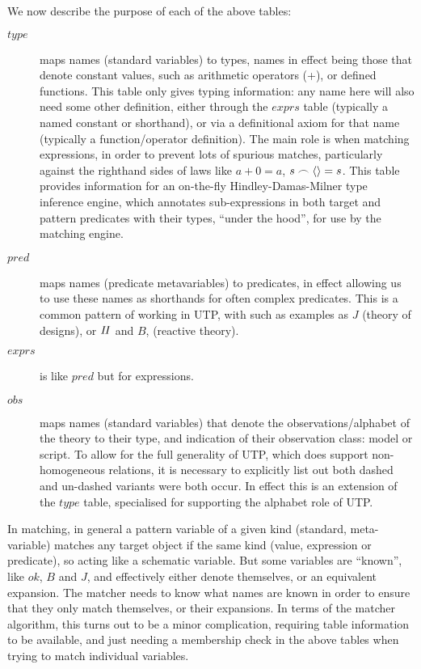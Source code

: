 We now describe the purpose of each of the above tables:
\begin{description}
  \item[$type$]
    maps names (standard variables) to types, names in effect being those that
    denote constant values, such as arithmetic operators (+),
    or defined functions.
    This table only gives typing information:
    any name here will also need some other definition,
    either through the $exprs$ table (typically a named constant or shorthand),
    or via a definitional axiom for that name (typically a function/operator definition).
    The main role is when matching expressions,
    in order to prevent lots of spurious matches, particularly against
    the righthand sides of laws like $a+0=a$, $s \frown \langle \rangle = s$.
    This table provides information for
    an on-the-fly Hindley-Damas-Milner type inference engine\cite{DAMAS82},
    which annotates sub-expressions in both target and pattern predicates
    with their types, ``under the hood'',
    for use by the matching engine.
  \item[$pred$]
    maps names (predicate metavariables) to predicates, in effect allowing us to use these names
    as shorthands for often complex predicates.
    This is a common pattern of working in UTP, with such as examples as $J$
    (theory of designs), or $\mathit{II}$ and $B$, (reactive theory).
  \item[$exprs$]
     is like $pred$ but for expressions.
  \item[$obs$]
    maps names (standard variables) that denote the observations/alphabet of the theory
    to their type, and indication of their observation class: model or script.
    To allow for the full generality of UTP,
    which does support non-homogeneous relations,
    it is necessary to explicitly list out both dashed and un-dashed variants
    were both occur. In effect this is an extension of the $type$ table,
    specialised for supporting the alphabet role of UTP.
\end{description}
In matching,
in general a pattern variable of a given kind (standard, meta-variable)
matches any target object if the same kind (value, expression or predicate),
so acting like a schematic variable.
But some variables are ``known'', like $ok$, $B$ and $J$,
and effectively either denote themselves, or an equivalent expansion.
The matcher needs to know what names are known in order to ensure
that they only match themselves, or their expansions.
In terms of the matcher algorithm, this turns out to be a minor
complication, requiring table information to be available,
and just needing a membership check in the above tables
when trying to match individual variables.

